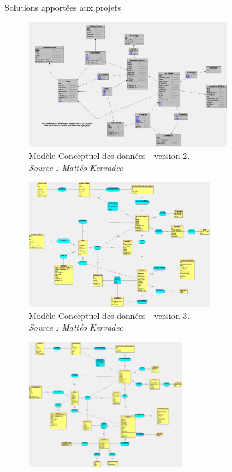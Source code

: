 \documentclass{beamer}
\begin{document}
\begin{frame}[label=realisation]{Solutions apportées aux projets}
\begin{center}
{			\begin{figure}[t]
  				\includegraphics[height=5.5cm]{../img/conception/mcd_V2.jpg}
				\caption{	
					\centering			
  					\href{https://github.com/Matteo-K/Soutenance_E-delic/blob/main/img/conception/mcd_V2.jpg}{\underline{Modèle Conceptuel des données - version 2}}.\\
  					\textit{Source : Mattéo Kervadec}
				}
  				\label{fig:mcdV2}
  			\end{figure}
		}
		 {
			\addtocounter{figure}{2}
			\begin{figure}[t]
  				\includegraphics[height=5.5cm]{../img/conception/mcd_V3.jpg}
				\caption{	
					\centering			
  					\href{https://github.com/Matteo-K/Soutenance_E-delic/blob/main/img/conception/mcd_V3.jpg}{\underline{Modèle Conceptuel des données - version 3}}.\\
  					\textit{Source : Mattéo Kervadec}
				}
  				\label{fig:mcdV3}
  			\end{figure}
		}
		\only<5> {
			\addtocounter{figure}{3}
			\begin{figure}[t]
  				\includegraphics[height=5.5cm]{../img/conception/mcd_V4.jpg}

\end{figure}}
\end{center}
\end{frame}
\end{document}
